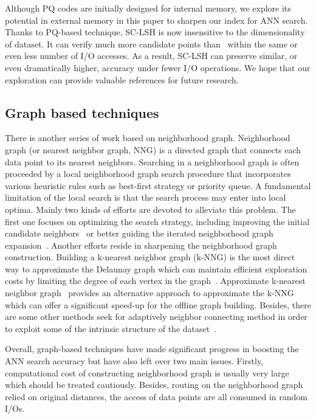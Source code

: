 \documentclass[twocolumn]{svjour3}          %
\begin{document}
Although PQ codes are initially designed for internal memory, we explore its potential in external memory in this paper to sharpen our index for ANN search. Thanks to PQ-based technique, SC-LSH is now insensitive to the dimensionality of dataset. It can verify much more candidate points than~\cite{Liu2014SKLSH} within the same or even less number of I/O accesses. As a result, SC-LSH can preserve similar, or even dramatically higher, accuracy under fewer I/O operations. We hope that our exploration can provide valuable references for future research.

\subsection{Graph based techniques}
There is another series of work based on neighborhood graph. Neighborhood graph (or nearest neighbor graph, NNG) is a directed graph that connects each data point to its nearest neighbors. Searching in a neighborhood graph is often proceeded by a local neighborhood graph search procedure that incorporates various heuristic rules such as best-first strategy or priority queue. A fundamental limitation of the local search is that the search process may enter into local optima. 
Mainly two kinds of efforts are devoted to alleviate this problem. The first one focuses on optimizing the search strategy, including improving the initial candidate neighbors~\cite{Hajebi2009AkNNG,Jin2014NNE} or better guiding the iterated neighborhood graph expansion~\cite{Wang2012Query,WangJD2013NNGPQ,Malkov2016HNSW,Fu2016EFANNA}. Another efforts reside in sharpening the neighborhood graph construction. Building a k-nearest neighbor graph (k-NNG) is the most direct way to approximate the Delaunay graph which can maintain efficient exploration costs by limiting the degree of each vertex in the graph~\cite{Dong2011kNNG,Paredes2006kNNG}. Approximate k-nearest neighbor graph~\cite{Hajebi2009AkNNG,Ponomarenko2011,Gan2012ScalablekNNG,Zhang2013FastkNNG} provides an alternative approach to approximate the k-NNG which can offer a significant speed-up for the offline graph building. Besides, there are some other methods seek for adaptively neighbor connecting method in order to exploit some of the intrinsic structure of the dataset~\cite{Malkov2014SmallWorld,HarwoodD2016FANNG}. 
  
Overall, graph-based techniques have made significant progress in boosting the ANN search accuracy but have also left over two main issues. Firstly, computational cost of constructing neighborhood graph is usually very large which should be treated cautiously. Besides, routing on the neighborhood graph relied on original distances, the access of data points are all consumed in random I/Os.
\end{document}
